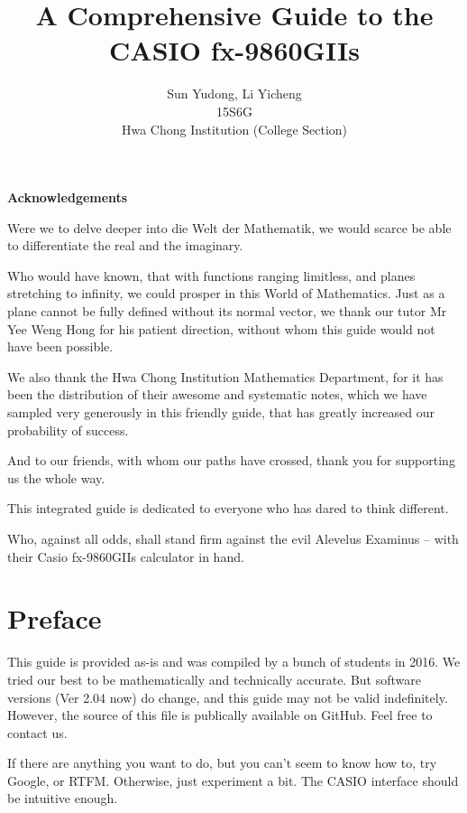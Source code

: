\documentclass[a5paper]{memoir}
\title{A Comprehensive Guide to the CASIO fx-9860GIIs}
\author{Sun Yudong, Li Yicheng \\ 15S6G \\ Hwa Chong Institution (College Section)}
\newenvironment{acknowledgements}%
{\cleardoublepage\thispagestyle{empty}\null\vfill\begin{center}%
		\bfseries Acknowledgements\end{center}}%
{\vfill\cleardoublepage\null}
\begin{document}
\begin{titlingpage}
	\maketitle
\end{titlingpage}

\frontmatter

\begin{acknowledgements}
	Were we to delve deeper into die Welt der Mathematik, we would scarce be able to differentiate the real and the imaginary.
	
	Who would have known, that with functions ranging limitless, and planes stretching to infinity, we could prosper in this World of Mathematics. Just as a plane cannot be fully defined without its normal vector, we thank our tutor Mr Yee Weng Hong for his patient direction, without whom this guide would not have been possible. 
	
	We also thank the Hwa Chong Institution Mathematics Department, for it has been the distribution of their awesome and systematic notes, which we have sampled very generously in this friendly guide, that has greatly increased our probability of success.
	
	And to our friends, with whom our paths have crossed, thank you for supporting us the whole way.
	
	This integrated guide is dedicated to everyone who has dared to think different.
	
	Who, against all odds, shall stand firm against the evil Alevelus Examinus -- with their Casio fx-9860GIIs calculator in hand.
\end{acknowledgements}

\tableofcontents

\chapter{Preface}
This guide is provided as-is and was compiled by a bunch of students in 2016. We tried our best to be mathematically and technically accurate. But software versions (Ver 2.04 now) do change, and this guide may not be valid indefinitely. However, the source of this file is publically available on GitHub. Feel free to contact us.

If there are anything you want to do, but you can't seem to know how to, try Google, or RTFM. Otherwise, just experiment a bit. The CASIO interface should be intuitive enough.
\end{document}

